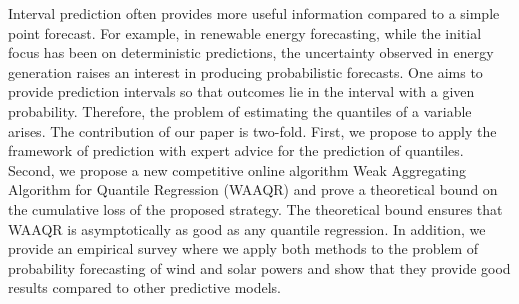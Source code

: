 
 Interval prediction often provides more useful information compared to a simple point forecast. For example, in renewable energy forecasting, while the initial focus has been on deterministic predictions, the uncertainty observed in energy generation raises an interest in producing probabilistic forecasts. One aims to provide prediction intervals so that outcomes lie in the interval with a given probability. Therefore, the problem of estimating the quantiles of a variable arises. The contribution of our paper is two-fold. First, we propose to apply the framework of prediction with expert advice for the prediction of quantiles. Second, we propose a new competitive online algorithm Weak Aggregating Algorithm for Quantile Regression (WAAQR) and prove a theoretical bound on the cumulative loss of the proposed strategy. The theoretical bound ensures that WAAQR is asymptotically as good as any quantile regression. In addition, we provide an empirical survey where we apply both methods to the problem of probability forecasting of wind and solar powers and show that they provide good results compared to other predictive models.



